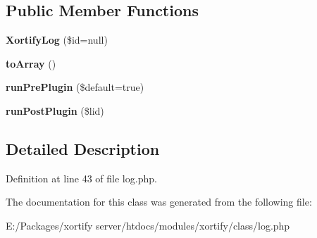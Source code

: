 \subsection*{Public Member Functions}
\begin{DoxyCompactItemize}
\item 
\hypertarget{class_xortify_log_ad1052ff390cc5da091cec62975f94ae5}{{\bfseries Xortify\-Log} (\$id=null)}\label{class_xortify_log_ad1052ff390cc5da091cec62975f94ae5}

\item 
\hypertarget{class_xortify_log_a658defb34762c8f40085aec87e16ba1a}{{\bfseries to\-Array} ()}\label{class_xortify_log_a658defb34762c8f40085aec87e16ba1a}

\item 
\hypertarget{class_xortify_log_a3f189f6b1ffd23878681ca12bb91a486}{{\bfseries run\-Pre\-Plugin} (\$default=true)}\label{class_xortify_log_a3f189f6b1ffd23878681ca12bb91a486}

\item 
\hypertarget{class_xortify_log_aa17aa62835f5fd61698b0b428c9932ac}{{\bfseries run\-Post\-Plugin} (\$lid)}\label{class_xortify_log_aa17aa62835f5fd61698b0b428c9932ac}

\end{DoxyCompactItemize}


\subsection{Detailed Description}


Definition at line 43 of file log.\-php.



The documentation for this class was generated from the following file\-:\begin{DoxyCompactItemize}
\item 
E\-:/\-Packages/xortify server/htdocs/modules/xortify/class/log.\-php\end{DoxyCompactItemize}
